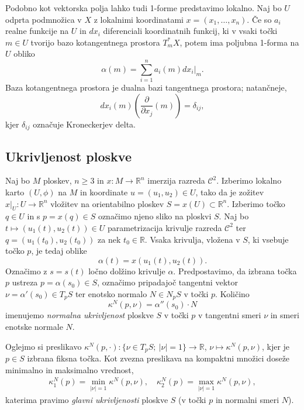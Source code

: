 \documentclass[12pt,a4paper,twoside]{article}
\theoremstyle{definition} %
\theoremstyle{plain} %
\numberwithin{equation}{section}  %
\newcommand{\R}{\mathbb R}
\begin{document}
Podobno kot vektorska polja lahko tudi 1-forme predstavimo lokalno. Naj bo $U$ odprta podmnožica v $X$ z lokalnimi koordinatami $x = (x_{1}, \dots, x_{n})$. Če so $a_{i}$ realne funkcije na $U$ in $dx_{i}$ diferenciali koordinatnih funkcij, ki v vsaki točki $m \in U$ tvorijo bazo kotangentnega prostora $T_{m}^{*}X$, potem ima poljubna 1-forma na $U$ obliko
\begin{equation}
\alpha (m) = \sum_{i=1}^{n} a_{i}(m) dx_{i} \big|_{m}.
\end{equation}
Baza kotangentnega prostora je dualna bazi tangentnega prostora; natančneje, 
\begin{equation*}
dx_{i}(m) \left(\frac{\partial}{\partial x_{j}} (m) \right) = \delta _{ij},
\end{equation*}
kjer $\delta_{ij}$ označuje Kroneckerjev delta.

\subsection{Ukrivljenost ploskve}
%
Naj bo $M$ ploskev, $n \geq 3$ in $x \colon M \to \R^{n}$ imerzija razreda $\mathcal{C}^2$. Izberimo lokalno karto $(U, \phi)$ na $M$ in koordinate $u = (u_1, u_2) \in U$, tako da je zožitev $x|_{U} \colon U \to \R^{n}$ vložitev na orientabilno ploskev $S = x(U) \subset \R^{n}$. Izberimo točko $q \in U$ in s $p = x(q) \in S$ označimo njeno sliko na ploskvi $S$. Naj bo $t \mapsto (u_1(t), u_2(t)) \in U$ parametrizacija krivulje razreda $\mathcal{C}^2$ ter $q = (u_1(t_0), u_2(t_0))$ za nek $t_0 \in \mathbb{R}$. Vsaka krivulja, vložena v $S$, ki vsebuje točko $p$, je tedaj oblike
\begin{equation}
\alpha (t) = x(u_1(t), u_2(t)).
\end{equation}
Označimo z $s = s(t)$ ločno dolžino krivulje $\alpha$. Predpostavimo, da izbrana točka $p$ ustreza $p = \alpha(s_0) \in S$, označimo pripadajoč tangentni vektor $\nu = \alpha '(s_0) \in T_{p}S$ ter enotsko normalo $N \in N_{p}S$ v točki $p$. Količino
\begin{equation}
\kappa ^{N}(p, \nu) = \alpha ''(s_0) \cdot N
\end{equation}
imenujemo \emph{normalna ukrivljenost} ploskve $S$ v točki $p$ v tangentni smeri $\nu$ in smeri enotske normale $N$.

Oglejmo si preslikavo $ \kappa ^{N}(p, \cdot) \colon \{\nu \in T_{p}S ; \ |\nu|=1 \} \to \R$, $ \nu \mapsto \kappa ^{N}(p, \nu)$, kjer je $p \in S$ izbrana fiksna točka. Kot zvezna preslikava na kompaktni množici doseže minimalno in maksimalno vrednost,
\begin{align} 
\kappa _{1}^{N}(p) = \min _{|\nu| = 1} \kappa ^{N}(p, \nu), \quad \kappa _{2}^{N}(p) = \max _{|\nu| = 1} \kappa ^{N}(p, \nu),
\end{align}
katerima pravimo \emph{glavni ukrivljenosti} ploskve $S$ (v točki $p$ in normalni smeri $N$).
\end{document}
